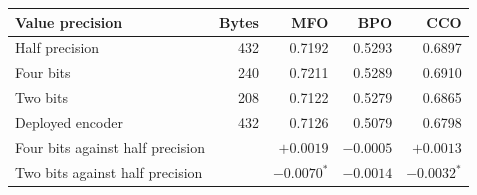 \begin{tabular}{lrrrr}
\toprule
    \textbf{Value precision} & \textbf{Bytes} & \textbf{MFO} & \textbf{BPO} & \textbf{CCO} \\
\midrule
    Half precision & 432 & 0.7192 & 0.5293 & 0.6897 \\
    Four bits & 240 & 0.7211 & 0.5289 & 0.6910 \\
    Two bits & 208 & 0.7122 & 0.5279 & 0.6865 \\
    Deployed encoder & 432 & 0.7126 & 0.5079 & 0.6798 \\
\midrule
    \quad Four bits against half precision & & $+0.0019$ & $-0.0005$ & $+0.0013$ \\
    \quad Two bits against half precision & & $-0.0070$$^{*}$ & $-0.0014$ & $-0.0032$$^{*}$ \\
\bottomrule
\end{tabular}
